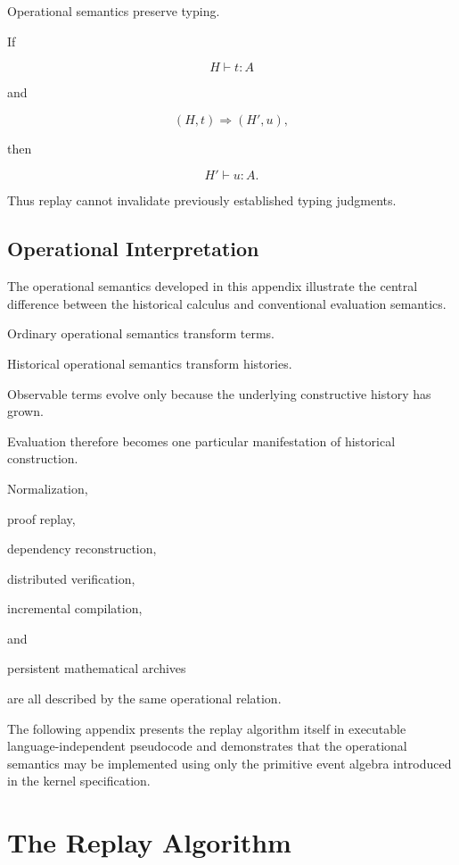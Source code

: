 \documentclass[12pt,oneside]{article}
\theoremstyle{definition}
\theoremstyle{remark}
\begin{document}
Operational semantics preserve typing.

If

\[
H
\vdash
t:A
\]

and

\[
(H,t)
\Longrightarrow
(H',u),
\]

then

\[
H'
\vdash
u:A.
\]

Thus replay cannot invalidate previously established typing judgments.


\subsection{Operational Interpretation}

The operational semantics developed in this appendix illustrate the central
difference between the historical calculus and conventional evaluation
semantics.

Ordinary operational semantics transform terms.

Historical operational semantics transform histories.

Observable terms evolve only because the underlying constructive history has
grown.

Evaluation therefore becomes one particular manifestation of historical
construction.

Normalization,

proof replay,

dependency reconstruction,

distributed verification,

incremental compilation,

and

persistent mathematical archives

are all described by the same operational relation.

The following appendix presents the replay algorithm itself in executable
language-independent pseudocode and demonstrates that the operational semantics
may be implemented using only the primitive event algebra introduced in the
kernel specification.

\section{The Replay Algorithm}
\end{document}
